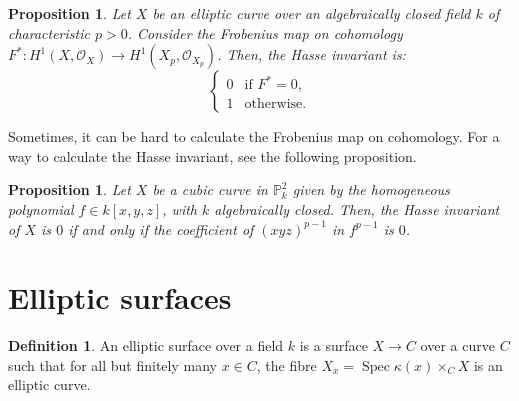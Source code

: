 \documentclass{report}
\DeclareMathOperator{\Spec}{Spec}
\newtheorem{proposition}[theorem]{Proposition}
\theoremstyle{definition}
\newtheorem{definition}[theorem]{Definition}
\begin{document}
\begin{proposition}
Let $X$ be an elliptic curve over an algebraically closed field $k$ of characteristic $p>0$. Consider the Frobenius map on cohomology $F^*:H^1(X,\mathcal{O}_X)\rightarrow H^1(X_p,\mathcal{O}_{X_p})$. Then, the Hasse invariant is:
\[\left\{\begin{array}{rcl}0&\text{if }F^*=0,\\1&\text{otherwise}.\end{array}\right.\]
\end{proposition}

Sometimes, it can be hard to calculate the Frobenius map on cohomology. For a way to calculate the Hasse invariant, see the following proposition.

\begin{proposition}
Let $X$ be a cubic curve in $\mathbb{P}_k^2$ given by the homogeneous polynomial $f\in k[x,y,z]$, with $k$ algebraically closed. Then, the Hasse invariant of $X$ is $0$ if and only if the coefficient of $(xyz)^{p-1}$ in $f^{p-1}$ is $0$.
\end{proposition}

\section{Elliptic surfaces}
\begin{definition}
An elliptic surface over a field $k$ is a surface $X\rightarrow C$ over a curve $C$ such that for all but finitely many $x\in C$, the fibre $X_x=\Spec\kappa(x)\times_CX$ is an elliptic curve.
\end{definition}
\end{document}
